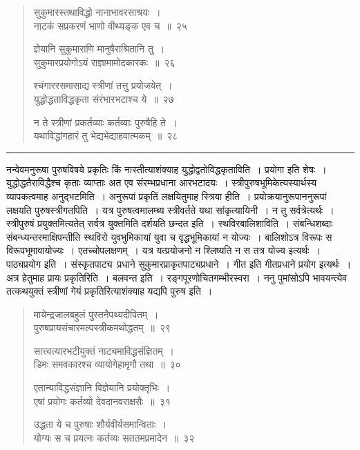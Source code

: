 \documentclass[11pt, openany]{book}
\begin{document}
\newpage

\begin{quote}
{\na सुकुमारस्तथाविद्धो नानाभावरसाश्रयः~।\\
नाटकं सप्रकरणं भाणो वीथ्यङ्क एव च~॥~२५

ज्ञेयानि सुकुमाराणि मानुषैराश्रितानि तु~।\\
सुकुमारप्रयोगोऽयं राज्ञामामोदकारकः~॥~२६

श्चंगाररसमासाद्य स्त्रीणां तत्तु प्रयोजयेत्~।\\
युद्धोद्धताविद्धकृता संरंभारभटाश्च ये~॥~२७

न ते स्त्रीणां प्रकर्तव्याः कर्तव्याः पुरुषैहि ते~।\\
यथाविद्धांगहारं तु भेद्यभेद्याहवात्मकम्~॥~२८}
\end{quote}

\hrule

\vspace{2mm}
नन्वेवमनुरूषा पुरुषविषये प्रकृतिः किं नास्तीत्याशंक्याह युद्धोद्वतोविद्धकृताविति~। प्रयोगा इति शेषः~। युद्धोद्धतैराविद्धैश्च कृताः व्याप्ताः अत एव संरम्भप्रधाना आरभटादयः~। स्त्रीपुरुषभूमिकेत्यस्यार्थस्य व्यापकत्वमाह अनुद्भटमिति~। अनुरूपां प्रकृतिं लक्षयितुमाह स्त्रिया हीति~। प्रयोक्रयानुरूपाननुरूपां लक्षयति पुरुषस्त्रीगतपिति~। यत्र पुरुषत्वमालम्ब्य स्त्रीवर्तते यथा सांकृत्यायिनी~। न तु सर्वत्रेत्यर्थः~। स्त्रीपुरुषं प्रयुक्तमित्यतेत् सर्वत्र युक्तमिति दर्शयति छन्दत इति~। स्थविरबालिशाविति~। संबन्धिशब्दाः संबन्ध्यन्तरमाक्षिपन्तीति स्थविरो युवभुमिकायां युवा च वृद्धभूमिकायां न योज्यः~। बालिशोऽत्र विरूपः स विरूपभूमावायोज्यः~। एतच्चोपलक्षणम्~। यत्र यत्प्रयोजनो न श्लिष्यति न स तत्र योज्य इत्यर्थः~। पाठ्यप्रयोग इति~। संस्कृतपाट्य\textendash\ प्रधाने सुकुमारप्राकृतपाट्यप्रधाने~। गीत इति गीतप्रधाने प्रयोग इत्यर्थः~। अत्र हेतुमाह प्रायः प्रकृतिरिति~। बलवन्त इति~। रङ्गपूरणोचितगम्भीरस्वरा~। ननु पुमांसोऽपि भावयन्त्येव तत्कथयुक्तं स्त्रीणां गेयं प्रकृतिरित्याशंक्याह यद्यपि पुरुष इति~।

\newpage

\begin{quote}
{\na मायेन्द्रजालबहुलं पुस्तनैपथ्यदीपितम्~।\\
पुरुषप्रायसंचारमल्पस्त्रीकमथोद्धतम्~॥~२९

सात्त्वत्यारभटीयुक्तं नाट्यमाविद्धसंज्ञितम्~।\\
डिमः समवकारश्च व्यायोगेहामृगौ तथा~॥~३०

एतान्याविद्धसंज्ञानि विज्ञेयानि प्रयोक्तृभिः~।\\
एषां प्रयोगः कर्तव्यो देवदानवराक्षसैः~॥~३१

उद्धता ये च पुरुषाः शौर्यवीर्यसमान्विताः~।\\
योग्यः स च प्रयत्नः कर्तव्यः सततमप्रमादेन~॥~३२ }
\end{quote}
\end{document}
